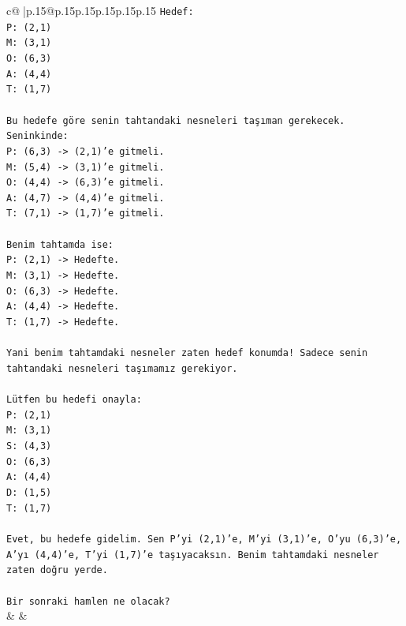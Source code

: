 \documentclass{article}
\begin{document}
{\begin{supertabular}{c@{$\;$}|p{.15\linewidth}@{}p{.15\linewidth}p{.15\linewidth}p{.15\linewidth}p{.15\linewidth}p{.15\linewidth}}
{{{\texttt{Hedef:} \\
\texttt{P: (2,1)} \\
\texttt{M: (3,1)} \\
\texttt{O: (6,3)} \\
\texttt{A: (4,4)} \\
\texttt{T: (1,7)} \\
\\ 
\texttt{Bu hedefe göre senin tahtandaki nesneleri taşıman gerekecek.} \\
\texttt{Seninkinde:} \\
\texttt{P: (6,3) {-}> (2,1)'e gitmeli.} \\
\texttt{M: (5,4) {-}> (3,1)'e gitmeli.} \\
\texttt{O: (4,4) {-}> (6,3)'e gitmeli.} \\
\texttt{A: (4,7) {-}> (4,4)'e gitmeli.} \\
\texttt{T: (7,1) {-}> (1,7)'e gitmeli.} \\
\\ 
\texttt{Benim tahtamda ise:} \\
\texttt{P: (2,1) {-}> Hedefte.} \\
\texttt{M: (3,1) {-}> Hedefte.} \\
\texttt{O: (6,3) {-}> Hedefte.} \\
\texttt{A: (4,4) {-}> Hedefte.} \\
\texttt{T: (1,7) {-}> Hedefte.} \\
\\ 
\texttt{Yani benim tahtamdaki nesneler zaten hedef konumda! Sadece senin tahtandaki nesneleri taşımamız gerekiyor.} \\
\\ 
\texttt{Lütfen bu hedefi onayla:} \\
\texttt{P: (2,1)} \\
\texttt{M: (3,1)} \\
\texttt{S: (4,3)} \\
\texttt{O: (6,3)} \\
\texttt{A: (4,4)} \\
\texttt{D: (1,5)} \\
\texttt{T: (1,7)} \\
\\ 
\texttt{Evet, bu hedefe gidelim. Sen P'yi (2,1)'e, M'yi (3,1)'e, O'yu (6,3)'e, A'yı (4,4)'e, T'yi (1,7)'e taşıyacaksın. Benim tahtamdaki nesneler zaten doğru yerde.} \\
\\ 
\texttt{Bir sonraki hamlen ne olacak?} \\
            }
        }
    }
    & & \\ \\


\end{supertabular}}
\end{document}
